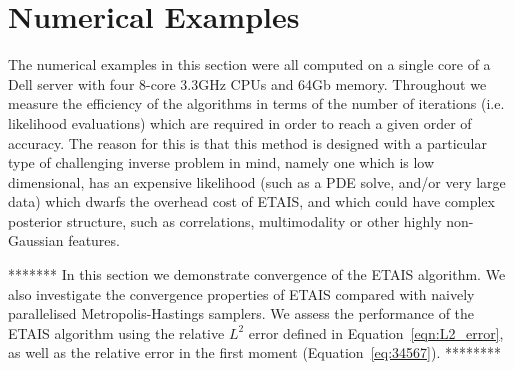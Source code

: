 \documentclass[final]{siamltex}
\begin{document}
\section{Numerical Examples}\label{Sec:Num}
The numerical examples in this section were all computed on a single
core of a Dell
server with four 8-core 3.3GHz CPUs and 64Gb memory. Throughout we
measure the efficiency of the algorithms in terms of the number of
iterations (i.e. likelihood evaluations) which are required in order
to reach a given order of accuracy. The reason for this is that this
method is designed with a particular type of challenging inverse
problem in mind, namely one which is low dimensional, has an expensive
likelihood (such as a PDE solve, and/or very large data) which dwarfs
the overhead cost of ETAIS, and which could have complex posterior
structure, such as correlations, multimodality or other highly
non-Gaussian features. 

*******
In this section we demonstrate convergence of the ETAIS algorithm. We
also investigate the convergence properties of ETAIS compared with
naively parallelised Metropolis-Hastings samplers. We assess the
performance of the ETAIS algorithm using the relative $L^2$ error
defined in Equation~\eqref{eqn:L2_error}, as well as the relative error in the
first moment (Equation~\eqref{eq:34567}).
********



\end{document}
